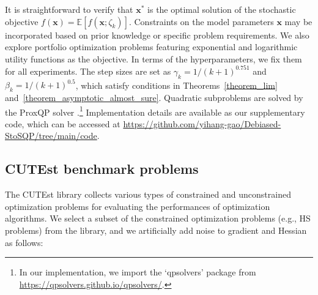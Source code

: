 \documentclass[aos]{imsart}
\numberwithin{equation}{section}
\theoremstyle{plain}
\begin{document}
It is straightforward to verify that  $\bm{x}^{*}$ is the optimal solution of the stochastic objective $f(\bm{x}) = \mathbb{E}\left[ f(\bm{x};\zeta_k) 
 \right]$. Constraints on the model parameters $\bm{x}$ may be incorporated based on prior knowledge or specific problem requirements.
We also explore portfolio optimization problems featuring exponential and logarithmic utility functions as the objective. 
In terms of the hyperparameters, we fix them for all experiments. 
The step sizes are set as $\gamma_k = 1/(k+1)^{0.751}$ and $\beta_k = 1 / (k+1)^{0.5}$, which satisfy conditions in Theorems~\ref{theorem_lim} and~\ref{theorem_asymptotic_almost_sure}. 
Quadratic subproblems are solved by the ProxQP solver \cite{bambade2022prox}.\footnote{In our implementation, we import the `qpsolvers' package from \url{https://qpsolvers.github.io/qpsolvers/}.} 
Implementation details are available as our supplementary code, which can be accessed at \url{https://github.com/yihang-gao/Debiased-StoSQP/tree/main/code}.


\subsection{CUTEst benchmark problems}
The CUTEst library collects various types of constrained and unconstrained optimization problems for evaluating the performances of optimization algorithms. 
We select a subset of the constrained optimization problems (e.g., HS problems) from the library, and we artificially add noise to gradient and Hessian as follows:
\end{document}
